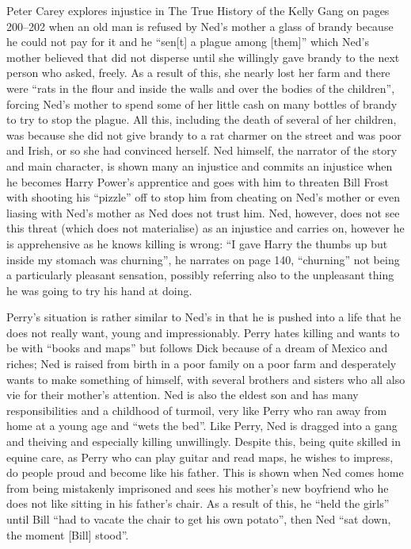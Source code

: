 \documentclass[12pt,a4paper]{article}
\begin{document}
Peter Carey explores injustice in The True History of the Kelly Gang on
pages 200--202 when an old man is refused by Ned's mother a glass of brandy
because he could not pay for it and he ``sen[t] a plague among [them]''
which Ned's mother believed that did not disperse until she willingly gave
brandy to the next person who asked, freely.  As a result of this,
she nearly lost her farm and there were ``rats in
the flour and inside the walls and over the bodies of the children'',
forcing Ned's mother to spend some of her little cash on many bottles of
brandy to try to stop the plague.  All this, including the death of several
of her children, was because she did
not give brandy to a rat charmer on the street and was poor and Irish, or
so she had convinced herself.  Ned
himself, the narrator of the story and main character, is shown many an injustice
and commits an injustice when he becomes Harry Power's apprentice and goes
with him to threaten Bill Frost with shooting his ``pizzle'' off to stop
him from cheating on Ned's mother or even liasing with Ned's mother as Ned
does not trust him.  Ned, however, does not see this threat (which does not
materialise) as an injustice and carries on, however he is apprehensive as
he knows killing is wrong: ``I gave Harry the thumbs up but inside my
stomach was churning'', he narrates on page 140, ``churning'' not being a
particularly pleasant sensation, possibly referring also to the unpleasant
thing he was going to try his hand at doing.

Perry's situation is rather similar to Ned's in that he is pushed into a
life that he does not really want, young and impressionably.  Perry hates
killing and wants to be with ``books and maps'' but follows Dick because of
a dream of Mexico and riches; Ned is raised from birth in a poor family on
a poor farm and desperately wants to make something of himself, with
several brothers and sisters who all also vie for their mother's attention.
Ned is also the eldest son and has many responsibilities and a childhood of
turmoil, very like Perry who ran away from home at a young age and ``wets
the bed''.  Like Perry, Ned is dragged into a gang and theiving and
especially killing unwillingly.  Despite this, being quite skilled in
equine care, as Perry who can play guitar and read maps, he wishes to
impress, do people proud and become like his father.  This is shown when
Ned comes home from being mistakenly imprisoned and sees his mother's new
boyfriend who he does not like sitting in his father's chair.  As a result
of this, he ``held the girls'' until Bill ``had to vacate the chair to get
his own potato'', then Ned ``sat down, the moment [Bill] stood''.
\end{document}
